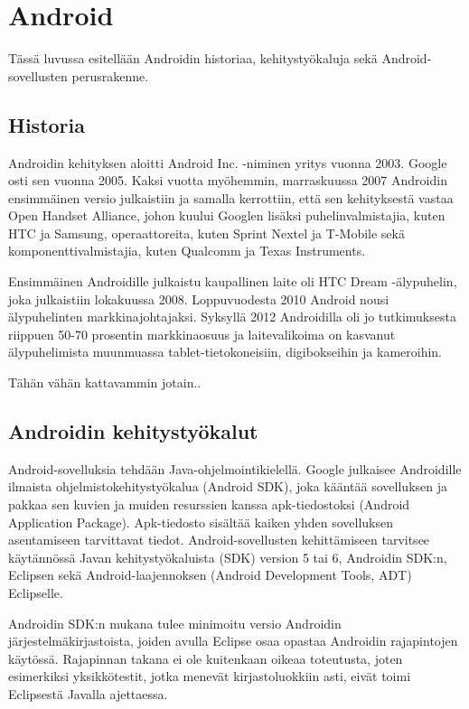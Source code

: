 \section{Android}

Tässä luvussa esitellään Androidin historiaa, kehitystyökaluja sekä Android-sovellusten perusrakenne.

\subsection{Historia}

Androidin kehityksen aloitti Android Inc. -niminen yritys vuonna 2003. Google osti sen vuonna 2005. Kaksi vuotta myöhemmin, marraskuussa 2007 Androidin ensimmäinen versio julkaistiin ja samalla kerrottiin, että sen kehityksestä vastaa Open Handset Alliance, johon kuului Googlen lisäksi puhelinvalmistajia, kuten HTC ja Samsung, operaattoreita, kuten Sprint Nextel ja T-Mobile sekä komponenttivalmistajia, kuten Qualcomm ja Texas Instruments.

Ensimmäinen Androidille julkaistu kaupallinen laite oli HTC Dream -älypuhelin, joka julkaistiin lokakuussa 2008.
Loppuvuodesta 2010 Android nousi älypuhelinten markkinajohtajaksi. Syksyllä 2012 Androidilla oli jo tutkimuksesta riippuen 50-70 prosentin markkinaosuus ja laitevalikoima on kasvanut älypuhelimista muunmuassa tablet-tietokoneisiin, digibokseihin ja kameroihin.\cite{wikiandroid}

Tähän vähän kattavammin jotain..

\subsection{Androidin kehitystyökalut}

Android-sovelluksia tehdään Java-ohjelmointikielellä. Google julkaisee Androidille ilmaista ohjelmistokehitystyökalua (Android SDK), joka kääntää sovelluksen ja pakkaa sen kuvien ja muiden resurssien kanssa apk-tiedostoksi (Android Application Package). Apk-tiedosto sisältää kaiken yhden sovelluksen asentamiseen tarvittavat tiedot. Android-sovellusten kehittämiseen tarvitsee käytännössä Javan kehitystyökaluista (SDK) version 5 tai 6, Androidin SDK:n, Eclipsen sekä Android-laajennoksen (Android Development Tools, ADT) Eclipselle.

Androidin SDK:n mukana tulee minimoitu versio Androidin järjestelmäkirjastoista, joiden avulla Eclipse osaa opastaa Androidin rajapintojen käytössä. Rajapinnan takana ei ole kuitenkaan oikeaa toteutusta, joten esimerkiksi yksikkötestit, jotka menevät kirjastoluokkiin asti, eivät toimi Eclipsestä Javalla ajettaessa.

